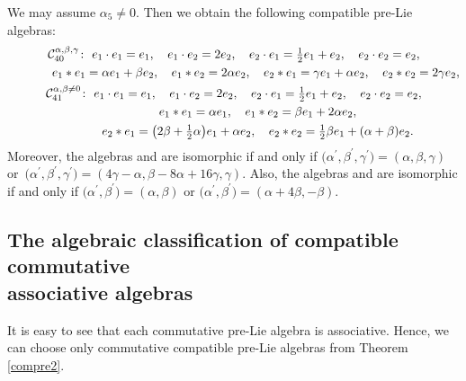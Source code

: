 \documentclass[10pt,a4paper]{amsart}
\numberwithin{equation}{section}
\begin{document}
We may assume $\alpha _{5}\neq 0$. Then we obtain the following compatible
pre-Lie algebras:
\begin{gather*}
\mathcal{C}_{40}^{\alpha ,\beta ,\gamma } \colon \
e_{1}\cdot e_{1}=e_{1}, \quad e_{1}\cdot e_{2}=2e_{2} , \quad e_{2}\cdot e_{1}=%
\tfrac{1}{2}e_{1}+e_{2},\quad e_{2}\cdot e_{2}=e_{2} , \\
\hphantom{\mathcal{C}_{40}^{\alpha ,\beta ,\gamma } \colon} \
e_{1}\ast e_{1}=\alpha e_{1}+\beta e_{2} , \quad e_{1}\ast e_{2}=2\alpha e_{2},
 \quad e_{2}\ast e_{1}=\gamma e_{1}+\alpha e_{2} , \quad e_{2}\ast e_{2}=2\gamma
e_{2},\\
\mathcal{C}_{41}^{\alpha ,\beta \neq 0} \colon \
 e_{1}\cdot e_{1}=e_{1} , \quad e_{1}\cdot e_{2}=2e_{2} , \quad e_{2}\cdot e_{1}=%
\tfrac{1}{2}e_{1}+e_{2} , \quad e_{2}\cdot e_{2}=e_{2} , \\
\hphantom{\mathcal{C}_{41}^{\alpha ,\beta \neq 0} \colon} \
 e_{1}\ast e_{1}=\alpha e_{1} ,\quad
 e_{1}\ast e_{2}=\beta e_{1}+2\alpha e_{2},
 \\
\hphantom{\mathcal{C}_{41}^{\alpha ,\beta \neq 0} \colon} \
 e_{2}\ast e_{1}=\bigl( 2\beta +\tfrac{1}{2}\alpha \bigr) e_{1}+\alpha
e_{2} , \quad e_{2}\ast e_{2}=\tfrac{1}{2}\beta e_{1}+( \alpha +\beta
) e_{2}.
\end{gather*}
Moreover, the algebras  and \smash{$\mathcal{C}%
_{40}^{\alpha ^{\prime },\beta ^{\prime },\gamma ^{\prime }}$} are isomorphic
if and only if
$\bigl( \alpha ^{\prime },\beta ^{\prime },\gamma ^{\prime
}\bigr) =( \alpha ,\beta ,\gamma )$ or~${\bigl( \alpha ^{\prime
},\beta ^{\prime },\gamma ^{\prime }\bigr) =( 4\gamma -\alpha ,\beta
-8\alpha +16\gamma ,\gamma )}$.
Also, the algebras \smash{$\mathcal{C}%
_{41}^{\alpha ,\beta }$} and 
are isomorphic if and only if
$
\bigl( \alpha ^{\prime },\beta ^{\prime
}\bigr) =( \alpha ,\beta ) $ or $\bigl( \alpha ^{\prime },\beta
^{\prime }\bigr) =( \alpha +4\beta ,-\beta )$.


\subsection[The algebraic classification of compatible commutative associative algebras]{The algebraic classification of compatible commutative\\ associative algebras}
It is easy to see that each commutative pre-Lie algebra is associative.
Hence, we can choose only commutative compatible pre-Lie algebras from Theorem \ref{compre2}.
\end{document}
